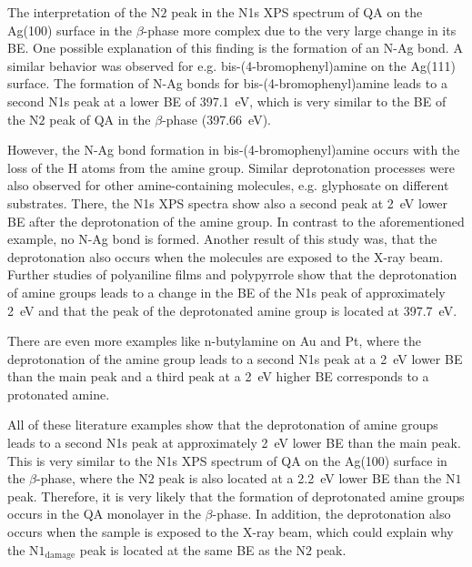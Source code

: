 The interpretation of the $\mathrm{N2}$ peak in the N1s \ac{XPS} spectrum of \ac{QA} on the Ag(100) surface in the $\beta$-phase more complex due to the very large change in its \ac{BE}. One possible explanation of this finding is the formation of an N-Ag bond. A similar behavior was observed for e.g. bis-(4-bromophenyl)amine on the Ag(111) surface.\autocite{Zhang2020} The formation of N-Ag bonds for bis-(4-bromophenyl)amine leads to a second N1s peak at a lower \ac{BE} of 397.1~\si{eV}, which is very similar to the \ac{BE} of the $\mathrm{N2}$ peak of \ac{QA} in the $\beta$-phase (397.66~\si{eV}).

However, the N-Ag bond formation in bis-(4-bromophenyl)amine occurs with the loss of the H atoms from the amine group.\autocite{Zhang2020} Similar deprotonation processes were also observed for other amine-containing molecules, e.g. glyphosate on different substrates.\autocite{Ruano2021} There, the N1s \ac{XPS} spectra show also a second peak at 2~\si{eV} lower \ac{BE} after the deprotonation of the amine group. In contrast to the aforementioned example, no N-Ag bond is formed. Another result of this study was, that the deprotonation also occurs when the molecules are exposed to the X-ray beam.\autocite{Ruano2021} Further studies of polyaniline films and polypyrrole show that the deprotonation of amine groups leads to a change in the \ac{BE} of the N1s peak of approximately 2~\si{eV} and that the peak of the deprotonated amine group is located at 397.7~\si{eV}.\autocite{Neoh1991,M.Mahat2015,Kang1991}

There are even more examples like n-butylamine on Au and Pt, where the deprotonation of the amine group leads to a second N1s peak at a 2~\si{eV} lower \ac{BE} than the main peak and a third peak at a 2~\si{eV} higher \ac{BE} corresponds to a protonated amine.\autocite{Adenier2004}

All of these literature examples show that the deprotonation of amine groups leads to a second N1s peak at approximately 2~\si{eV} lower \ac{BE} than the main peak. This is very similar to the N1s \ac{XPS} spectrum of \ac{QA} on the Ag(100) surface in the $\beta$-phase, where the $\mathrm{N2}$ peak is also located at a 2.2~\si{eV} lower \ac{BE} than the $\mathrm{N1}$ peak. Therefore, it is very likely that the formation of deprotonated amine groups occurs in the \ac{QA} monolayer in the $\beta$-phase. In addition, the deprotonation also occurs when the sample is exposed to the X-ray beam, which could explain why the $\mathrm{N1_{damage}}$ peak is located at the same \ac{BE} as the $\mathrm{N2}$ peak.


